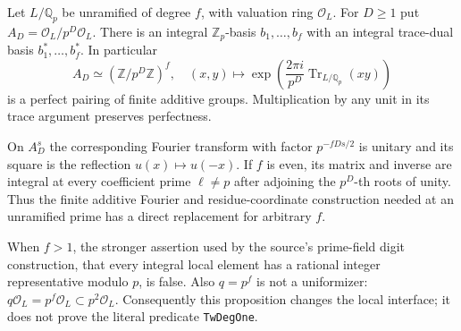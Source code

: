 \begin{proposition}
\label{AC-G41-trace}
Let $L/\mathbb Q_p$ be unramified of degree $f$, with valuation
ring $\mathcal O_L$.  For $D\geq1$ put
$A_D=\mathcal O_L/p^D\mathcal O_L$.  There is an integral
$\mathbb Z_p$-basis $b_1,\ldots,b_f$ with an integral trace-dual
basis $b_1^*,\ldots,b_f^*$.  In particular
\[
 A_D\simeq(\mathbb Z/p^D\mathbb Z)^f,
 \quad
 (x,y)\longmapsto
  \exp\!\left(\frac{2\pi i}{p^D}
              \operatorname{Tr}_{L/\mathbb Q_p}(xy)\right)
                                                               \tag{G41.8}
\]
is a perfect pairing of finite additive groups.  Multiplication
by any unit in its trace argument preserves perfectness.

On $A_D^s$ the corresponding Fourier transform with factor
$p^{-fDs/2}$ is unitary and its square is the reflection
$u(x)\mapsto u(-x)$.  If $f$ is even, its matrix and inverse
are integral at every coefficient prime $\ell\ne p$ after
adjoining the $p^D$-th roots of unity.  Thus the finite additive
Fourier and residue-coordinate construction needed at an
unramified prime has a direct replacement for arbitrary $f$.

When $f>1$, the stronger assertion used by the source's
prime-field digit construction, that every integral local
element has a rational integer representative modulo $p$,
is false.  Also $q=p^f$ is not a uniformizer:
$q\mathcal O_L=p^f\mathcal O_L\subset p^2\mathcal O_L$.
Consequently this proposition changes the local interface;
it does not prove the literal predicate \texttt{TwDegOne}.
\end{proposition}
